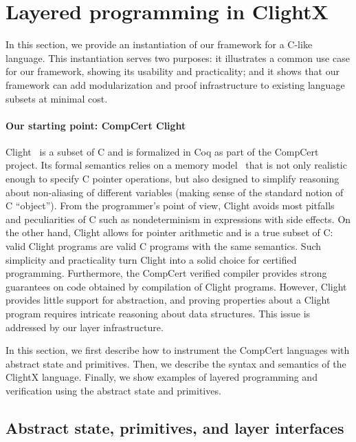 \section{Layered programming in ClightX}
\label{sec:seq:clight}

In this section, we provide an instantiation of our framework for a
C-like language. This instantiation serves two purposes: it
illustrates a common use case for our framework, showing its usability
and practicality; and it shows that our framework can add
modularization and proof infrastructure to existing language subsets
at minimal cost.

\paragraph{Our starting point: CompCert Clight}

Clight~\cite{blazy-leroy-clight} is a subset of C and is
formalized in Coq as part of the CompCert project.  Its formal
semantics relies on a memory model~\cite{leroy08} that is not only
realistic enough to specify C pointer operations, but also designed to
simplify reasoning about non-aliasing of different
variables (making sense of the standard notion of C ``object'').
From the programmer's point of view, 
Clight avoids most pitfalls and peculiarities of C such
as nondeterminism in expressions with side effects. 
On the other hand,
Clight allows for pointer arithmetic and is a true subset of C: valid
Clight programs are valid C programs with the same semantics.
Such
simplicity and practicality turn Clight into a solid choice for
certified programming.
Furthermore,
the CompCert verified compiler
provides strong guarantees on code
obtained by compilation of Clight programs.
However, Clight provides little support for abstraction,
and proving properties
about a Clight program requires intricate reasoning about
data structures. This issue is addressed by our layer infrastructure.


In this section, we first describe how to instrument the CompCert
languages with abstract state and primitives. Then, we describe the
syntax and semantics of the ClightX language. Finally, we show
examples of layered programming and verification using the abstract
state and primitives.

\subsection{Abstract state, primitives, and layer interfaces}

